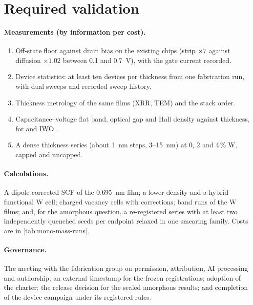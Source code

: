 \section{Required validation}
\label{sec:mono-concl-validation}

\paragraph{Measurements (by information per cost).}
\begin{enumerate}
\item Off-state floor against drain bias on the existing chips (strip $\times7$ against diffusion $\times1.02$ between 0.1
and 0.7~V), with the gate current recorded.
\item Device statistics: at least ten devices per thickness from one fabrication run, with dual sweeps and recorded sweep
history.
\item Thickness metrology of the same films (XRR, TEM) and the stack order.
\item Capacitance--voltage flat band, optical gap and Hall density against thickness, for \InO{} and IWO.
\item A dense thickness series (about 1~nm steps, 3--15~nm) at 0, 2 and 4\,\% W, capped and uncapped.
\end{enumerate}

\paragraph{Calculations.} A dipole-corrected SCF of the 0.695~nm film; a lower-density and a hybrid-functional W cell;
charged vacancy cells with corrections; band runs of the W films; and, for the amorphous question, a re-registered
series with at least two independently quenched seeds per endpoint relaxed in one smearing family. Costs are in
\cref{tab:mono-mass-runs}.

\paragraph{Governance.} The meeting with the fabrication group on permission, attribution, AI processing and authorship;
an external timestamp for the frozen registrations; adoption of the charter; the release decision for the sealed
amorphous results; and completion of the device campaign under its registered rules.

